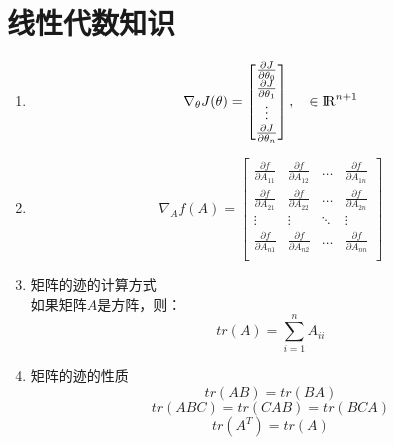 \section{线性代数知识}
\begin{enumerate}
	\item
	\begin{equation}
		\nabla_{\theta}J(\theta) = \left[\begin{matrix}
		\frac{\partial J}{\partial\theta_0} \\
		\frac{\partial J}{\partial\theta_1} \\
		\vdots \\
		\frac{\partial J}{\partial\theta_n} \\
		\end{matrix}\right], \quad \in {\rm I\!R}^{n+1}
	\end{equation}

	\item
	\begin{equation}
		\nabla_Af(A) = \left[ \begin{matrix}
			\frac{\partial f}{\partial A_{11}} & \frac{\partial f}{\partial A_{12}} & \dots & \frac{\partial f}{\partial A_{1n}} \\
			\frac{\partial f}{\partial A_{21}} & \frac{\partial f}{\partial A_{22}} & \dots & \frac{\partial f}{\partial A_{2n}} \\
			\vdots & \vdots & \ddots & \vdots \\
			\frac{\partial f}{\partial A_{n1}} & \frac{\partial f}{\partial A_{n2}}& \dots & \frac{\partial f}{\partial A_{nn}} \\
		\end{matrix}\right]
	\end{equation}

	\item 矩阵的迹的计算方式 \\
	如果矩阵$A$是方阵，则：
	\begin{equation}
		tr(A) = \sum_{i=1}^nA_{ii}
	\end{equation}

	\item 矩阵的迹的性质
	\begin{equation}
		tr(AB) = tr(BA)
	\end{equation}
	\begin{equation}
		tr(ABC) = tr(CAB) = tr(BCA)
	\end{equation}
	\begin{equation}
		tr(A^T) = tr(A)
	\end{equation}
\end{enumerate}